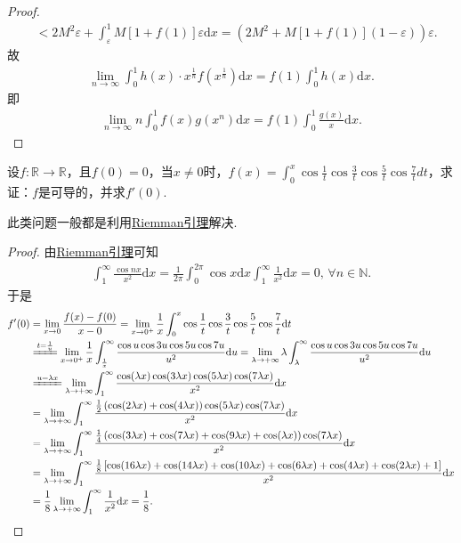 \documentclass[../../main.tex]{subfiles}
\begin{document}
\begin{proof}
\begin{align*}
&<2M^2\varepsilon+\int_{\varepsilon}^1 M\left[1+f(1)\right]\varepsilon\mathrm{d}x=\left(2M^2+M\left[1+f(1)\right]\left(1-\varepsilon\right)\right)\varepsilon.
\end{align*}
故
\begin{align*}
\lim\limits_{n\rightarrow \infty}\int_0^1 h(x)\cdot x^{\frac{1}{n}}f\left(x^{\frac{1}{n}}\right)\mathrm{d}x=f(1)\int_0^1 h(x)\mathrm{d}x.
\end{align*}
即
\begin{align*}
\lim_{n\rightarrow \infty}n\int_0^1 f(x)g(x^n)\mathrm{d}x=f(1)\int_0^1 \frac{g(x)}{x}\mathrm{d}x.
\end{align*}
\end{proof}

\begin{example}
设$f:\mathbb{R}\to\mathbb{R}$，且$f(0)=0$，当$x\neq0$时，$f(x)=\int_0^x\cos\frac{1}{t}\cos\frac{3}{t}\cos\frac{5}{t}\cos\frac{7}{t}dt$，求证：$f$是可导的，并求$f'(0)$.
\end{example}
\begin{note}
此类问题一般都是利用\hyperref[lemma:Riemann引理]{Riemman引理}解决.
\end{note}
\begin{proof}
由\hyperref[lemma:Riemann引理]{Riemman引理}可知
\begin{align*}
\int_1^{\infty} \frac{\cos nx}{x^2} \mathrm{d}x = \frac{1}{2\pi} \int_0^{2\pi} \cos x \mathrm{d}x \int_1^{\infty} \frac{1}{x^2} \mathrm{d}x = 0, \, \forall n \in \mathbb{N}.
\end{align*}
于是
\begin{align*}
f'(0) &= \lim_{x \to 0} \frac{f(x) - f(0)}{x - 0} = \lim_{x \to 0^+} \frac{1}{x} \int_0^x \cos \frac{1}{t} \cos \frac{3}{t} \cos \frac{5}{t} \cos \frac{7}{t} \mathrm{d}t \\
&\xlongequal{t = \frac{1}{u}} \lim_{x \to 0^+} \frac{1}{x} \int_{\frac{1}{x}}^{\infty} \frac{\cos u \cos 3u \cos 5u \cos 7u}{u^2} \mathrm{d}u = \lim_{\lambda \to +\infty} \lambda \int_{\lambda}^{\infty} \frac{\cos u \cos 3u \cos 5u \cos 7u}{u^2} \mathrm{d}u \\
&\xlongequal{u = \lambda x} \lim_{\lambda \to +\infty} \int_1^{\infty} \frac{\cos(\lambda x) \cos(3\lambda x) \cos(5\lambda x) \cos(7\lambda x)}{x^2} \mathrm{d}x \\
&= \lim_{\lambda \to +\infty} \int_1^{\infty} \frac{\frac{1}{2} \left( \cos(2\lambda x) + \cos(4\lambda x) \right) \cos(5\lambda x) \cos(7\lambda x)}{x^2} \mathrm{d}x \\
&= \lim_{\lambda \to +\infty} \int_1^{\infty} \frac{\frac{1}{4} \left( \cos(3\lambda x) + \cos(7\lambda x) + \cos(9\lambda x) + \cos(\lambda x) \right) \cos(7\lambda x)}{x^2} \mathrm{d}x \\
&= \lim_{\lambda \to +\infty} \int_1^{\infty} \frac{\frac{1}{8} \left[ \cos(16\lambda x) + \cos(14\lambda x) + \cos(10\lambda x) + \cos(6\lambda x) + \cos(4\lambda x) + \cos(2\lambda x) + 1 \right]}{x^2} \mathrm{d}x \\
&= \frac{1}{8} \lim_{\lambda \to +\infty} \int_1^{\infty} \frac{1}{x^2} \mathrm{d}x = \frac{1}{8}.
\end{align*}
\end{proof}
\end{document}

